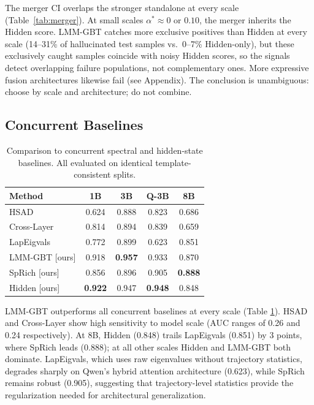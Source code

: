 \documentclass{article}
\begin{document}
The merger CI overlaps the stronger standalone at every scale
(Table~\ref{tab:merger}).  At small scales $\alpha^*{\approx}0$ or
$0.10$, the merger inherits the Hidden score.  LMM-GBT catches more
exclusive positives than Hidden at every scale (14--31\% of
hallucinated test samples vs.\ 0--7\% Hidden-only), but these
exclusively caught samples coincide with noisy Hidden scores, so the
signals detect overlapping failure populations, not complementary ones.
More expressive fusion architectures likewise fail (see Appendix).
The conclusion is unambiguous: choose by scale and architecture; do not
combine.

\subsection{Concurrent Baselines}

\begin{table}[t]
\centering
\setlength{\tabcolsep}{2pt}
\caption{Comparison to concurrent spectral and hidden-state baselines.
  All evaluated on identical template-consistent splits.}
\label{tab:concurrent}
\footnotesize
\begin{tabular}{lcccc}
\toprule
Method & 1B & 3B & Q-3B & 8B \\
\midrule
HSAD \cite{li2025llm}           & 0.624 & 0.888 & 0.823 & 0.686 \\
Cross-Layer \cite{badash2026between} & 0.814 & 0.894 & 0.839 & 0.659 \\
LapEigvals \cite{binkowski2025hallucination} & 0.772 & 0.899 & 0.623 & 0.851 \\
\midrule
LMM-GBT [ours]  & 0.918          & \textbf{0.957} & 0.933 & 0.870 \\
SpRich [ours]    & 0.856          & 0.896          & 0.905 & \textbf{0.888} \\
Hidden [ours]    & \textbf{0.922} & 0.947          & \textbf{0.948} & 0.848 \\
\bottomrule
\end{tabular}
\end{table}

LMM-GBT outperforms all concurrent baselines at every scale
(Table \ref{tab:concurrent}).  HSAD and Cross-Layer show high
sensitivity to model scale (AUC ranges of 0.26 and 0.24 respectively).
At 8B, Hidden (0.848) trails LapEigvals (0.851) by 3 points, where
SpRich leads (0.888); at all other scales Hidden and LMM-GBT both
dominate.  LapEigvals, which uses raw eigenvalues without trajectory
statistics, degrades sharply on Qwen's hybrid attention architecture
(0.623), while SpRich remains robust (0.905), suggesting that
trajectory-level statistics provide the regularization needed for
architectural generalization.
\end{document}
